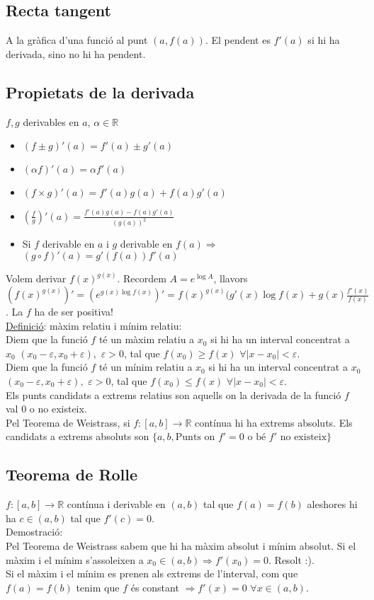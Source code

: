 \documentclass[../main.tex]{subfiles}
\begin{document}
    \subsection{Recta tangent}
    A la gràfica d'una funció al punt $(a, f(a))$. El pendent es $f'(a)$ si hi ha derivada, sino no hi ha pendent.
    \subsection{Propietats de la derivada}
    $f, g$ derivables en $a$, $\alpha \in \mathbb{R}$
    \begin{itemize}
        \item $(f \pm g)'(a) = f'(a) \pm g'(a)$
        \item $(\alpha f)'(a) = \alpha f'(a)$
        \item $(f\times g)'(a) = f'(a)g(a) + f(a)g'(a)$
        \item $(\frac{f}{g})'(a) = \frac{f'(a)g(a) - f(a)g'(a)}{(g(a))^2}$
        \item Si $f$ derivable en $a$ i $g$ derivable en $f(a) \Rightarrow$ $(g \circ f)'(a) = g'(f(a))f'(a)$
    \end{itemize}
    Volem derivar $f(x)^{g(x)}$. Recordem $A = e^{\log{A}}$, llavors $(f(x)^{g(x)})' = (e^{g(x)\log{f(x)}})' = f(x)^{g(x)}(g'(x)\log{f(x)} + g(x) \frac{f'(x)}{f(x)}$. La $f$ ha de ser positiva!\\
    \underline{Definició}: màxim relatiu i mínim relatiu:\\
    Diem que la funció $f$ té un màxim relatiu a $x_0$ si hi ha un interval concentrat a $x_0$ $(x_0 - \varepsilon, x_0 + \varepsilon),$ $\varepsilon > 0$, tal que $f(x_0) \geq f(x)$ $\forall |x - x_0| < \varepsilon$.\\
    Diem que la funció $f$ té un mínim relatiu a $x_0$ si hi ha un interval concentrat a $x_0$ $(x_0 - \varepsilon, x_0 + \varepsilon),$ $\varepsilon > 0$, tal que $f(x_0) \leq f(x)$ $\forall |x - x_0| < \varepsilon$.\\
    Els punts candidats a extrems relatius son aquells on la derivada de la funció $f$ val $0$ o no existeix.\\
    Pel Teorema de Weistrass, si $f: [a, b] \rightarrow \mathbb{R}$ contínua hi ha extrems absoluts. Els candidats a extrems absoluts son $\{a, b, \text{Punts on } f'=0 \text{ o bé } f' \text{ no existeix}\}$
    \subsection{Teorema de Rolle}
    $f: [a, b] \rightarrow \mathbb{R}$ contínua i derivable en $(a, b)$ tal que $f(a) = f(b)$ aleshores hi ha $c \in (a, b)$ tal que $f'(c) = 0$.\\
    Demostració:\\
    Pel Teorema de Weistrass sabem que hi ha màxim absolut i mínim absolut. Si el màxim i el mínim s'assoleixen a $x_0 \in (a, b) \Rightarrow f'(x_0) = 0$. Resolt :).\\
    Si el màxim i el mínim es prenen als extrems de l'interval, com que $f(a)=f(b)$ tenim que $f$ és constant $\Rightarrow f'(x) = 0$ $\forall x \in (a, b)$.
\end{document}
